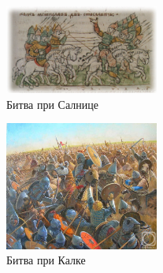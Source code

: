 \begin{figure}[ht]
    \centering
    \includegraphics[width=0.45\textwidth]{img/rus/4.jpg}
    \caption{Битва при Салнице}
    \label{fig:salnitsa}
\end{figure}

\begin{figure}[ht]
    \centering
    \includegraphics[width=0.45\textwidth]{img/rus/5.jpg}
    \caption{Битва при Калке}
    \label{fig:kalka}
\end{figure}

